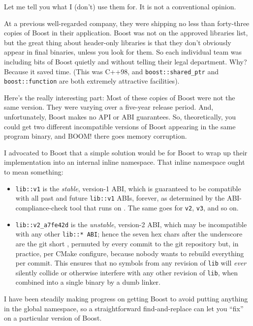 \noindent Let me tell you what I (don't) use them for. It is not a conventional
opinion.

At a previous well-regarded company, they were shipping no less than
forty-three copies of Boost in their application. Boost was not on the
approved libraries list, but the great thing about header-only libraries
is that they don't obviously appear in final binaries, unless you look
for them. So each individual team was including bits of Boost quietly
and without telling their legal department. Why? Because it saved time.
(This was C++98, and \lstinline!boost::shared_ptr! and
\lstinline!boost::function! are both extremely attractive facilities).

Here's the really interesting part: Most of these copies of Boost were
not the same version. They were varying over a five-year release period.
And, unfortunately, Boost makes no API or ABI guarantees. So,
theoretically, you could get two different incompatible versions of
Boost appearing in the same program binary, and BOOM! there goes memory
corruption.

I advocated to Boost that a simple solution would be for Boost to wrap
up their implementation into an internal inline namespace. That inline
namespace ought to mean something:
\begin{itemize}
\item{\lstinline!lib::v1! is the \emph{stable}, version-1 ABI, which is guaranteed to be compatible with all past and future \lstinline!lib::v1! ABIs, forever, as determined by the ABI-compliance-check tool that runs on . The same goes for \lstinline!v2!, \lstinline!v3!, and so on.}
\item{\lstinline!lib::v2_a7fe42d! is the \emph{unstable}, version-2 ABI, which may be incompatible with any other \lstinline!lib::*!~\lstinline!ABI!; hence the seven hex chars after the underscore are the git short , permuted by every commit to the git repository but, in practice, per CMake configure, because nobody wants to rebuild everything per commit. This ensures that no symbols from any revision of \lstinline!lib! will \emph{ever} silently collide or otherwise interfere with any other revision of \lstinline!lib!, when combined into a single binary by a dumb linker.}
\end{itemize}

I have been steadily making progress on getting Boost to avoid putting
anything in the global namespace, so a straightforward find-and-replace
can let you ``fix'' on a particular version of Boost.

